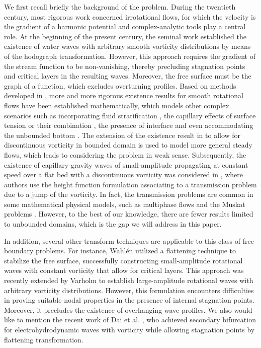 \documentclass[11pt,reqno]{amsart}
\numberwithin{equation}{section}
\theoremstyle{definition}
\theoremstyle{remark}
\begin{document}
We first recall briefly the background of the problem. During the
twentieth century, most rigorous work concerned irrotational flows,
for which the velocity is the gradient of a harmonic potential and
complex-analytic tools play a central role. At the beginning of the
present century, the seminal work \cite{ConstantinS} established the
existence of water waves with arbitrary smooth vorticity
distributions by means of the hodograph transformation. However,
this approach requires the gradient of the stream function to be
non-vanishing, thereby precluding stagnation points and critical
layers in the resulting waves. Moreover, the free surface must be
the graph of a function, which excludes overturning profiles.
Based on methods developed in \cite{ConstantinS}, more and more rigorous
existence results for smooth rotational flows have been established
mathematically, which models other complex scenarios such as
incorporating fluid stratification \cite{ChuDE,ChuW,Walsh09}, the capillary
effects of surface tension \cite{CaoQ,Wahlen1} or their
combination \cite{Walsh14a}, the presence of interface
\cite{ChuE,ChuY,Matioc} and even accommodating the unbounded bottom
\cite{Hur06,Hur11}. The extension of the existence result in
\cite{ConstantinS1} to allow for discontinuous vorticity in bounded
domain is used to model more general steady flows, which leads to
considering the problem in weak sense. Subsequently, the existence
of capillary-gravity waves of small-amplitude propagating at
constant speed over a flat bed with a discontinuous vorticity was
considered in \cite{MartinM}, where authors use the height function
formulation associating to a transmission problem due to a jump of
the vorticity. In fact, the transmission problems are common in some
mathematical physical models, such as multiphase flows
\cite{Escher,Sinambela} and the Muskat problems
\cite{Cordoba,Cheng,MatiocM}. However, to the best of our knowledge,
there are fewer results limited to unbounded domains, which is the
gap we will address in this paper.

In addition, several other transform techniques are applicable to this class of free boundary problems. For instance, Wahl\'{e}n \cite{Wahlen2} utilized a flattening technique to stabilize the free surface, successfully constructing small-amplitude rotational waves with constant vorticity that allow for critical layers. This approach was recently extended by Varholm \cite{Varholm} to establish large-amplitude rotational waves with arbitrary vorticity distributions. However, this formulation encounters difficulties in proving suitable nodal properties in the presence of internal stagnation points. Moreover, it precludes the existence of overhanging wave profiles. We also would like to mention the recent work of Dai et al. \cite{DaiXZ}, who achieved secondary bifurcation for electrohydrodynamic waves with vorticity while allowing stagnation points by flattening transformation.
\end{document}
